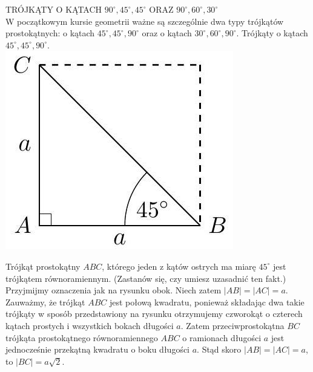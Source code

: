 \documentclass[10pt]{article}
\begin{document}
TRÓJKĄTY O KĄTACH \(90^{\circ}, 45^{\circ}, 45^{\circ}\) ORAZ \(90^{\circ}, 60^{\circ}, 30^{\circ}\)\\
W początkowym kursie geometrii ważne są szczególnie dwa typy trójkątów prostokątnych: o kątach \(45^{\circ}, 45^{\circ}, 90^{\circ}\) oraz o kątach \(30^{\circ}, 60^{\circ}, 90^{\circ}\). Trójkąty o kątach \(45^{\circ}, 45^{\circ}, 90^{\circ}\).\\
\includegraphics[max width=\textwidth, center]{2024_11_21_71f62bd117d375398909g-133}

Trójkąt prostokątny \(A B C\), którego jeden z kątów ostrych ma miarę \(45^{\circ}\) jest trójkątem równoramiennym. (Zastanów się, czy umiesz uzasadnić ten fakt.)\\
Przyjmijmy oznaczenia jak na rysunku obok. Niech zatem \(|A B|=|A C|=a\).\\
Zauważmy, że trójkąt \(A B C\) jest połową kwadratu, ponieważ składając dwa takie trójkąty w sposób przedstawiony na rysunku otrzymujemy czworokąt o czterech kątach prostych i wszystkich bokach długości \(a\). Zatem przeciwprostokątna \(B C\) trójkąta prostokątnego równoramiennego \(A B C\) o ramionach długości \(a\) jest jednocześnie przekątną kwadratu o boku długości \(a\). Stąd skoro \(|A B|=|A C|=a\), to \(|B C|=a \sqrt{2}\).
\end{document}
